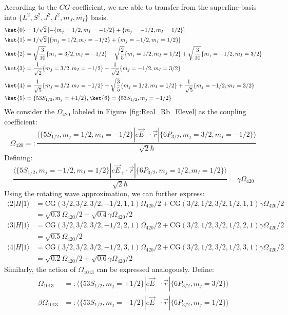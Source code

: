 \documentclass[11pt]{article}
\begin{document}
According to the $CG$-coefficient, we are able to transfer from the superfine-basis into $\{L^2,S^2,J^2,I^2,m_J,m_I\}$ basis.
\begin{align*}
\ket{0} &= 1/\sqrt{2}\left[-\{m_j = 1/2, m_I = -1/2\} + \{m_j = -1/2, m_I = 1/2\}\right] \\
\ket{1} &= 1/\sqrt{2}\left[\{m_j = 1/2, m_I = -1/2\} +\{m_j = -1/2, m_I = 1/2\}\right] \\
\ket{2} &= \sqrt{\frac{3}{10}}\{m_j = 3/2, m_I = -1/2\} -\sqrt{\frac{2}{5}}\{m_j = 1/2, m_I = 1/2\} +\sqrt{\frac{3}{10}} \{m_j = -1/2, m_I = 3/2\}\\
\ket{3} &= \frac{1}{\sqrt{2}}\{m_j = 3/2, m_I = -1/2\} -\frac{1}{\sqrt{2}} \{m_j = -1/2, m_I = 3/2\} \\
\ket{4} &= \frac{1}{\sqrt{5}}\{m_j = 3/2, m_I = -1/2\} +\sqrt{\frac{3}{5}}\{m_j = 1/2, m_I = 1/2\} +\frac{1}{\sqrt{5}} \{m_j = -1/2, m_I = 3/2\}\\
\ket{5}&= \{53S_{1/2},m_j = +1/2\}, \ket{6}= \{53S_{1/2},m_j = -1/2\}
\end{align*}
We consider the $\Omega_{420}$ labeled in Figure~\ref{fig:Real_Rb_Elevel} as the coupling coefficient:
\[
\Omega_{420} =: \frac{\langle \{5S_{1/2}, m_j = 1/2, m_I = -1/2\}| e\vec{E}_+\cdot \vec{r}| \{6P_{3/2}, m_j = 3/2, m_I = -1/2\}\rangle}{\sqrt{2}\hbar}
\]
Defining:
\[
\frac{\langle \{5S_{1/2}, m_j = -1/2, m_I = 1/2\}| e\vec{E}_+\cdot \vec{r}| \{6P_{3/2}, m_j = 1/2, m_I = 1/2\}\rangle}{\sqrt{2}\hbar} = \gamma \Omega_{420}
\]
Using the rotating wave approximation, we can further express:
\begin{align*}
\langle 2| H | 1 \rangle &= \text{CG}(3/2,3/2,3/2,-1/2,1,1)\Omega_{420}/2 +\text{CG}(3/2,1/2,3/2,1/2,1,1) \gamma \Omega_{420}/2 \\
&=\sqrt{0.3}\Omega_{420}/2 - \sqrt{0.4}\gamma \Omega_{420}/2 \\
\langle 3| H | 1 \rangle &= \text{CG}(3/2,3/2,3/2,-1/2,2,1)\Omega_{420}/2 +\text{CG}(3/2,1/2,3/2,1/2,2,1) \gamma \Omega_{420}/2 \\
&=\sqrt{0.5}\Omega_{420}/2 \\
\langle 4| H | 1 \rangle &= \text{CG}(3/2,3/2,3/2,-1/2,3,1)\Omega_{420}/2 +\text{CG}(3/2,1/2,3/2,1/2,3,1) \gamma \Omega_{420}/2 \\
&=\sqrt{0.2}\Omega_{420}/2 + \sqrt{0.6}\gamma \Omega_{420}/2 
\end{align*}
Similarly, the action of $\Omega_{1013}$ can be expressed analogously. Define:
\begin{align}
\Omega_{1013} &=: \langle\{53S_{1/2},m_j = +1/2\}|e\vec{E}_-\cdot \vec{r} |\{6P_{3/2},m_j = 3/2\}\rangle \\
\beta \Omega_{1013} &=: \langle\{53S_{1/2},m_j = -1/2\}|e\vec{E}_-\cdot \vec{r} |\{6P_{3/2},m_j = 1/2\}\rangle
\end{align}
\end{document}
